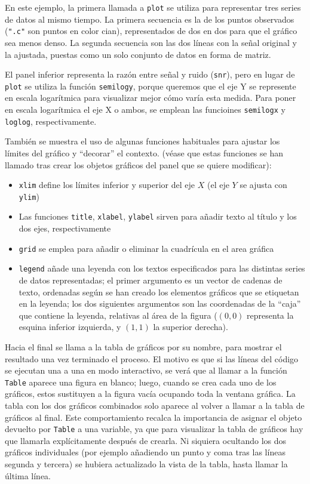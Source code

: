 ﻿\documentclass{article}
\newcommand{\jl}{\texttt}
\begin{document}
En este ejemplo, la primera llamada a \jl{plot} se utiliza para representar tres series de datos al mismo tiempo. La primera secuencia es la de los puntos observados (\jl{".c"} son puntos en color cian), representados de dos en dos para que el gráfico sea menos denso. La segunda secuencia son las dos líneas con la señal original y la ajustada, puestas como un solo conjunto de datos en forma de matriz.

El panel inferior representa la razón entre señal y ruido (\jl{snr}), pero en lugar de \jl{plot} se utiliza la función \jl{semilogy}, porque queremos que el eje Y se represente en escala logarítmica para visualizar mejor cómo varía esta medida. Para poner en escala logarítmica el eje X o ambos, se emplean las funcioines \jl{semilogx} y \jl{loglog}, respectivamente.

También se muestra el uso de algunas funciones habituales para ajustar los límites del gráfico y ``decorar'' el contexto. (véase que estas funciones se han llamado tras crear los objetos gráficos del panel que se quiere modificar):


\begin{itemize}
  \item \jl{xlim} define los límites inferior y superior del eje $X$ (el eje $Y$ se ajusta con \jl{ylim})
  \item Las funciones \jl{title}, \jl{xlabel}, \jl{ylabel} sirven para añadir texto al título y los dos ejes, respectivamente
  \item \jl{grid} se emplea para añadir o eliminar la cuadrícula en el area gráfica
  \item \jl{legend} añade una leyenda con los textos especificados para las distintas series de datos representadas; el primer argumento es un vector de cadenas de texto, ordenadas según se han creado los elementos gráficos que se etiquetan en la leyenda; los dos siguientes argumentos son las coordenadas de la ``caja'' que contiene la leyenda, relativas al área de la figura ($(0,0)$ representa la esquina inferior izquierda, y $(1,1)$ la superior derecha).
\end{itemize}

Hacia el final se llama a la tabla de gráficos por su nombre, para mostrar el resultado una vez terminado el proceso. El motivo es que si las líneas del código se ejecutan una a una en modo interactivo, se verá que al llamar a la función \jl{Table} aparece una figura en blanco; luego, cuando se crea cada uno de los gráficos, estos sustituyen a la figura vacía ocupando toda la ventana gráfica. La tabla con los dos gráficos combinados solo aparece al volver a llamar a la tabla de gráficos al final. Este comportamiento recalca la importancia de asignar el objeto devuelto por \jl{Table} a una variable, ya que para visualizar la tabla de gráficos hay que llamarla explícitamente después de crearla. Ni siquiera ocultando los dos gráficos individuales (por ejemplo añadiendo un punto y coma tras las líneas segunda y tercera) se hubiera actualizado la vista de la tabla, hasta llamar la última línea.
\end{document}
